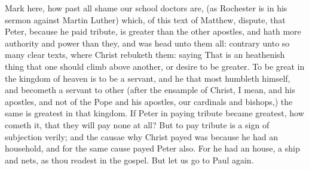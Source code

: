 Mark here, how past all shame our school doctors are, 
(as Rochester is in his sermon against Martin Luther) 
which, of this text of Matthew, dispute, that Peter, because
he paid tribute, is greater than the other apostles, and hath
more authority and power than they, and was head unto 
them all: contrary unto so many clear texts, where Christ 
rebuketh them: saying That is an heathenish thing that one 
should climb above another, or desire to be greater. To be 
great in the kingdom of heaven is to be a servant, and he 
that most humbleth himself, and becometh a servant to 
other (after the ensample of Christ, I mean, and his apostles, 
and not of the Pope and his apostles, our cardinals and 
bishops,) the same is greatest in that kingdom. If Peter 
in paying tribute became greatest, how cometh it, that they 
will pay none at all? But to pay tribute is a sign of subjection
verily; and the causae why Christ payed was because 
he had an household, and for the same cause payed Peter 
also. For he had an house, a ship and nets, as thou readest 
in the gospel. But let us go to Paul again. 

